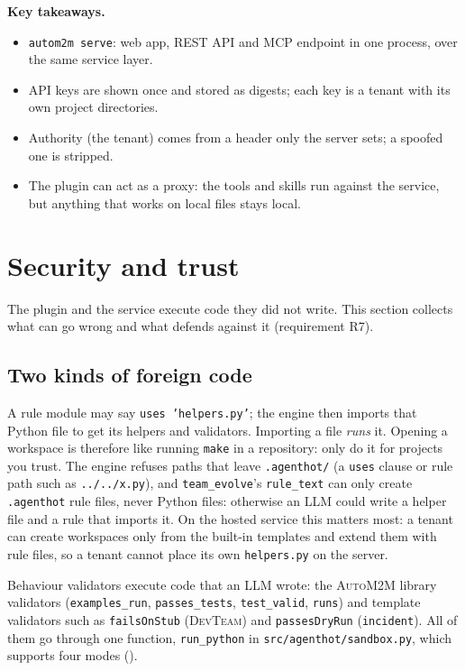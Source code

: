 \documentclass[10pt,a4paper]{article}
\newcommand{\auto}{\textsc{AutoM2M}}
\newcommand{\devteam}{\textsc{DevTeam}}
\newcommand{\code}[1]{\texttt{#1}}
\newcommand{\file}[1]{\texttt{#1}}
\newcommand{\mcptool}[1]{\texttt{#1}}
\newcommand{\what}[1]{\par\smallskip\noindent{\sffamily\bfseries\color{accent}#1}\quad}
\newenvironment{takeaway}{%
  \begin{tcolorbox}[enhanced, breakable, colback=keybg, colframe=keybg, arc=0pt, boxrule=0pt,
     borderline west={2.2pt}{0pt}{keybar}, left=8pt, right=8pt, top=5pt, bottom=5pt,
     before skip=8pt, after skip=8pt]
  \textsf{\bfseries\color{keybar}Key takeaways.}\par\smallskip}{\end{tcolorbox}}
\begin{document}
\begin{takeaway}
\begin{itemize}
\item \code{autom2m serve}: web app, REST API and MCP endpoint in one
process, over the same service layer.
\item API keys are shown once and stored as digests; each key is a tenant
with its own project directories.
\item Authority (the tenant) comes from a header only the server sets; a
spoofed one is stripped.
\item The plugin can act as a proxy: the tools and skills run against the
service, but anything that works on local files stays local.
\end{itemize}
\end{takeaway}

\section{Security and trust}\label{sec:security}

The plugin and the service execute code they did not write. This section
collects what can go wrong and what defends against it (requirement R7).

\subsection{Two kinds of foreign code}

\what{Project helpers.} A rule module may say \code{uses 'helpers.py'}; the
engine then imports that Python file to get its helpers and validators.
Importing a file \emph{runs} it. Opening a workspace is therefore like running
\code{make} in a repository: only do it for projects you trust. The engine
refuses paths that leave \file{.agenthot/} (a \code{uses} clause or rule path
such as \code{../../x.py}), and \mcptool{team\_evolve}'s \code{rule\_text}
can only create \file{.agenthot} rule files, never Python files: otherwise an
LLM could write a helper file and a rule that imports it. On the hosted
service this matters most: a tenant can create workspaces only from the
built-in templates and extend them with rule files, so a tenant cannot place
its own \file{helpers.py} on the server.

\what{LLM-written values.} Behaviour validators execute code that an LLM
wrote: the \auto{} library validators (\code{examples\_run},
\code{passes\_tests}, \code{test\_valid}, \code{runs}) and template
validators such as \code{failsOnStub} (\devteam{}) and \code{passesDryRun}
(\code{incident}). All of them go through one function, \code{run\_python}
in \file{src/agenthot/sandbox.py}, which supports four modes
().
\end{document}
